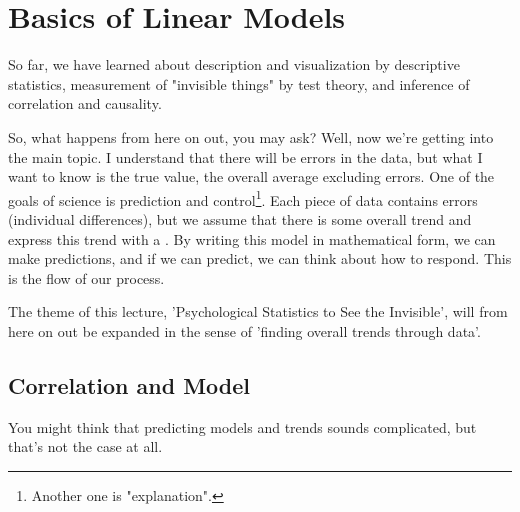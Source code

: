 \documentclass{ltjbook}
\begin{document}
\chapter{Basics of Linear Models}
\label{m09_Regression}

So far, we have learned about description and visualization by descriptive statistics, measurement of "invisible things" by test theory, and inference of correlation and causality.

So, what happens from here on out, you may ask? Well, now we're getting into the main topic.
I understand that there will be errors in the data, but what I want to know is the true value, the overall average excluding errors.
One of the goals of science is prediction and control\footnote{Another one is "explanation".}. Each piece of data contains errors (individual differences), but we assume that there is some overall trend and express this trend with a . By writing this model in mathematical form, we can make predictions, and if we can predict, we can think about how to respond. This is the flow of our process.

The theme of this lecture, 'Psychological Statistics to See the Invisible', will from here on out be expanded in the sense of 'finding overall trends through data'.

\section{Correlation and Model}
You might think that predicting models and trends sounds complicated, but that's not the case at all.
\end{document}
